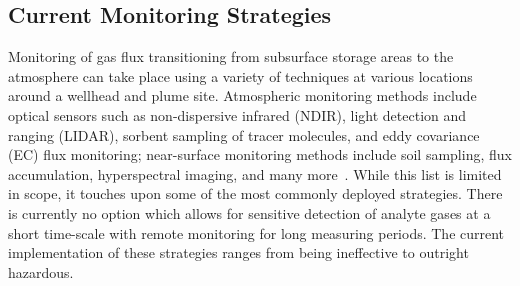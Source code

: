 \documentclass[journal]{IEEEtran}
\begin{document}
\subsection{Current Monitoring Strategies}

Monitoring of gas flux transitioning from subsurface storage areas to the atmosphere can take place using a variety of techniques at various locations around a wellhead and plume site.  Atmospheric monitoring methods include optical sensors such as non-dispersive infrared (NDIR), light detection and ranging (LIDAR), sorbent sampling of tracer molecules, and eddy covariance (EC) flux monitoring; near-surface monitoring methods include soil sampling, flux accumulation,  hyperspectral imaging, and many more~\cite{netl_best_2012}.  While this list is limited in scope, it touches upon some of the most commonly deployed strategies.  There is currently no option which allows for sensitive detection of analyte gases at a short time-scale with remote monitoring for long measuring periods.  The current implementation of these strategies ranges from being ineffective to outright hazardous.
\end{document}
